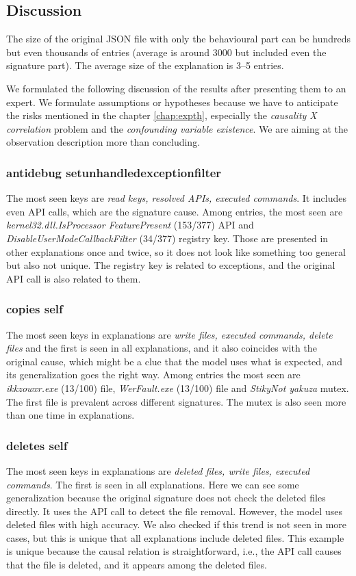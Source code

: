 \subsection{Discussion}
The size of the original JSON file with only the behavioural part can be hundreds but even thousands of entries (average is around $3000$ but included even the signature part). The average size of the explanation is 3--5 entries.

We formulated the following discussion of the results after presenting them to an expert. We formulate assumptions or hypotheses because we have to anticipate the risks mentioned in the chapter \ref{chap:expth}, especially the \emph{causality X correlation} problem and the \emph{confounding variable existence}. We are aiming at the observation description more than concluding.

\subsubsection*{antidebug setunhandledexceptionfilter}
The most seen keys are \emph{read keys, resolved APIs, executed commands}. It includes even API calls, which are the signature cause. Among entries, the most seen are \emph{kernel32.dll.IsProcessor FeaturePresent} (153/377) API and \emph{DisableUserModeCallbackFilter} (34/377) registry key. Those are presented in other explanations once and twice, so it does not look like something too general but also not unique. The registry key is related to exceptions, and the original API call is also related to them.

\subsubsection*{copies self}
The most seen keys in explanations are \emph{write files, executed commands, delete files} and the first is seen in all explanations, and it also coincides with the original cause, which might be a clue that the model uses what is expected, and its generalization goes the right way. Among entries the most seen are \emph{ikkzowxr.exe} (13/100) file, \emph{WerFault.exe} (13/100) file and \emph{StikyNot yakuza} mutex. The first file is prevalent across different signatures. The mutex is also seen more than one time in explanations.

\subsubsection*{deletes self}
The most seen keys in explanations are \emph{deleted files, write files, executed commands}. The first is seen in all explanations. Here we can see some generalization because the original signature does not check the deleted files directly. It uses the API call to detect the file removal. However, the model uses deleted files with high accuracy. We also checked if this trend is not seen in more cases, but this is unique that all explanations include deleted files. This example is unique because the causal relation is straightforward, i.e., the API call causes that the file is deleted, and it appears among the deleted files. 

